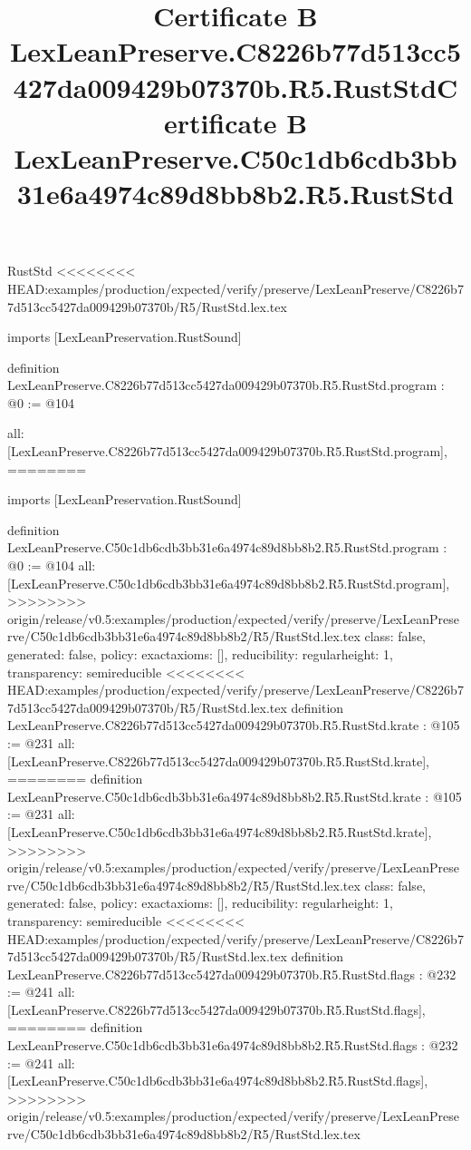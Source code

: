 \begin{lexlean}{RustStd}
<<<<<<<< HEAD:examples/production/expected/verify/preserve/LexLeanPreserve/C8226b77d513cc5427da009429b07370b/R5/RustStd.lex.tex
\title{Certificate B LexLeanPreserve.C8226b77d513cc5427da009429b07370b.R5.RustStd}
\begin{coremodule}
imports [LexLeanPreservation.RustSound]

definition LexLeanPreserve.C8226b77d513cc5427da009429b07370b.R5.RustStd.program : @0 := @104 {
  all: [LexLeanPreserve.C8226b77d513cc5427da009429b07370b.R5.RustStd.program],
========
\title{Certificate B LexLeanPreserve.C50c1db6cdb3bb31e6a4974c89d8bb8b2.R5.RustStd}
\begin{coremodule}
imports [LexLeanPreservation.RustSound]

definition LexLeanPreserve.C50c1db6cdb3bb31e6a4974c89d8bb8b2.R5.RustStd.program : @0 := @104 {
  all: [LexLeanPreserve.C50c1db6cdb3bb31e6a4974c89d8bb8b2.R5.RustStd.program],
>>>>>>>> origin/release/v0.5:examples/production/expected/verify/preserve/LexLeanPreserve/C50c1db6cdb3bb31e6a4974c89d8bb8b2/R5/RustStd.lex.tex
  class: false,
  generated: false,
  policy: exact{axioms: []},
  reducibility: regular{height: 1},
  transparency: semireducible
}
<<<<<<<< HEAD:examples/production/expected/verify/preserve/LexLeanPreserve/C8226b77d513cc5427da009429b07370b/R5/RustStd.lex.tex
definition LexLeanPreserve.C8226b77d513cc5427da009429b07370b.R5.RustStd.krate : @105 := @231 {
  all: [LexLeanPreserve.C8226b77d513cc5427da009429b07370b.R5.RustStd.krate],
========
definition LexLeanPreserve.C50c1db6cdb3bb31e6a4974c89d8bb8b2.R5.RustStd.krate : @105 := @231 {
  all: [LexLeanPreserve.C50c1db6cdb3bb31e6a4974c89d8bb8b2.R5.RustStd.krate],
>>>>>>>> origin/release/v0.5:examples/production/expected/verify/preserve/LexLeanPreserve/C50c1db6cdb3bb31e6a4974c89d8bb8b2/R5/RustStd.lex.tex
  class: false,
  generated: false,
  policy: exact{axioms: []},
  reducibility: regular{height: 1},
  transparency: semireducible
}
<<<<<<<< HEAD:examples/production/expected/verify/preserve/LexLeanPreserve/C8226b77d513cc5427da009429b07370b/R5/RustStd.lex.tex
definition LexLeanPreserve.C8226b77d513cc5427da009429b07370b.R5.RustStd.flags : @232 := @241 {
  all: [LexLeanPreserve.C8226b77d513cc5427da009429b07370b.R5.RustStd.flags],
========
definition LexLeanPreserve.C50c1db6cdb3bb31e6a4974c89d8bb8b2.R5.RustStd.flags : @232 := @241 {
  all: [LexLeanPreserve.C50c1db6cdb3bb31e6a4974c89d8bb8b2.R5.RustStd.flags],
>>>>>>>> origin/release/v0.5:examples/production/expected/verify/preserve/LexLeanPreserve/C50c1db6cdb3bb31e6a4974c89d8bb8b2/R5/RustStd.lex.tex
}}}
\end{coremodule}}
\end{coremodule}
\end{lexlean}

